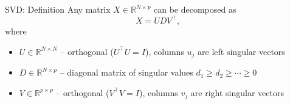 \documentclass[aspectratio=169,t]{beamer}
\begin{document}

\begin{frame}{SVD: Definition}
  Any matrix $X \in \mathbb{R}^{N \times p}$ can be decomposed as
  $$X = U D V^\top,$$
  where
  \begin{itemize}
    \item $U \in \mathbb{R}^{N \times N}$ -- orthogonal ($U^\top U = I$), columns $u_j$ are left singular vectors
    \item $D \in \mathbb{R}^{N \times p}$ -- diagonal matrix of singular values $d_1 \geq d_2 \geq \cdots \geq 0$
    \item $V \in \mathbb{R}^{p \times p}$ -- orthogonal ($V^\top V = I$), columns $v_j$ are right singular vectors
  \end{itemize}
  
\end{frame}
\end{document}
